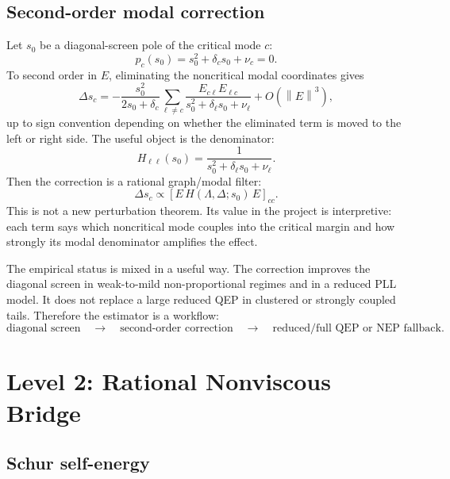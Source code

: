 \documentclass[11pt]{article}
\newcommand{\norm}[1]{\left\lVert #1 \right\rVert}
\begin{document}
\subsection{Second-order modal correction}

Let $s_0$ be a diagonal-screen pole of the critical mode $c$:
\begin{equation}
  p_c(s_0)=s_0^2+\delta_cs_0+\nu_c=0.
  \label{eq:critical-diagonal-pole}
\end{equation}
To second order in $E$, eliminating the noncritical modal coordinates gives
\begin{equation}
  \Delta s_c
  =-\frac{s_0^2}{2s_0+\delta_c}
    \sum_{\ell\ne c}
    \frac{E_{c\ell}E_{\ell c}}
    {s_0^2+\delta_\ell s_0+\nu_\ell}
    +O(\norm{E}^3),
  \label{eq:second-order-correction}
\end{equation}
up to sign convention depending on whether the eliminated term is moved to the
left or right side. The useful object is the denominator:
\begin{equation}
  H_{\ell\ell}(s_0)=\frac{1}{s_0^2+\delta_\ell s_0+\nu_\ell}.
  \label{eq:rational-filter-H}
\end{equation}
Then the correction is a rational graph/modal filter:
\begin{equation}
  \Delta s_c \propto [E\,H(\Lambda,\Delta;s_0)\,E]_{cc}.
  \label{eq:rational-filter-form}
\end{equation}
This is not a new perturbation theorem. Its value in the project is
interpretive: each term says which noncritical mode couples into the critical
margin and how strongly its modal denominator amplifies the effect.

The empirical status is mixed in a useful way. The correction improves the
diagonal screen in weak-to-mild non-proportional regimes and in a reduced PLL
model. It does not replace a large reduced QEP in clustered or strongly coupled
tails. Therefore the estimator is a workflow:
\[
  \text{diagonal screen}\quad\to\quad
  \text{second-order correction}\quad\to\quad
  \text{reduced/full QEP or NEP fallback}.
\]

\section{Level 2: Rational Nonviscous Bridge}

\subsection{Schur self-energy}
\end{document}
